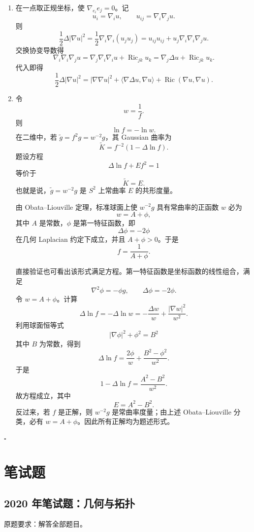\documentclass[UTF8,12pt]{ctexart}
\newenvironment{solution}{%
  \par\medskip
  \noindent{\bfseries 解答}\quad\ignorespaces
}{\hfill$\square$\par\medskip}
\begin{document}
\begin{solution}
\begin{enumerate}[label=(\alph*)]
\item 在一点取正规坐标，使 \(\nabla_{e_i}e_j=0\)。记
\[
u_i=\nabla_i u,\qquad u_{ij}=\nabla_i\nabla_j u.
\]
则
\[
\frac12\Delta|\nabla u|^2
=\frac12\nabla_i\nabla_i(u_j u_j)
=u_{ij}u_{ij}+u_j\nabla_i\nabla_i\nabla_j u.
\]
交换协变导数得
\[
\nabla_i\nabla_i\nabla_j u
=\nabla_j\nabla_i\nabla_i u+\operatorname{Ric}_{jk}u_k
=\nabla_j\Delta u+\operatorname{Ric}_{jk}u_k.
\]
代入即得
\[
\frac12\Delta|\nabla u|^2
=|\nabla\nabla u|^2+\langle\nabla\Delta u,\nabla u\rangle
+\operatorname{Ric}(\nabla u,\nabla u).
\]

\item 令
\[
w=\frac1f.
\]
则
\[
\ln f=-\ln w.
\]
在二维中，若 \(\tilde g=f^2g=w^{-2}g\)，其 Gaussian 曲率为
\[
\tilde K=f^{-2}(1-\Delta\ln f).
\]
题设方程
\[
\Delta\ln f+Ef^2=1
\]
等价于
\[
\tilde K=E.
\]
也就是说，\(\tilde g=w^{-2}g\) 是 \(S^2\) 上常曲率 \(E\) 的共形度量。

由 Obata--Liouville 定理，标准球面上使 \(w^{-2}g\) 具有常曲率的正函数 \(w\) 必为
\[
w=A+\phi,
\]
其中 \(A\) 是常数，\(\phi\) 是第一特征函数，即
\[
\Delta\phi=-2\phi
\]
在几何 Laplacian 约定下成立，并且 \(A+\phi>0\)。于是
\[
f=\frac1{A+\phi}.
\]

直接验证也可看出该形式满足方程。第一特征函数是坐标函数的线性组合，满足
\[
\nabla^2\phi=-\phi g,\qquad \Delta\phi=-2\phi.
\]
令 \(w=A+\phi\)。计算
\[
\Delta\ln f=-\Delta\ln w
=-\frac{\Delta w}{w}+\frac{|\nabla w|^2}{w^2}.
\]
利用球面恒等式
\[
|\nabla\phi|^2+\phi^2=B^2
\]
其中 \(B\) 为常数，得到
\[
\Delta\ln f
=\frac{2\phi}{w}+\frac{B^2-\phi^2}{w^2}.
\]
于是
\[
1-\Delta\ln f
=\frac{A^2-B^2}{w^2}.
\]
故方程成立，其中
\[
E=A^2-B^2.
\]
反过来，若 \(f\) 是正解，则 \(w^{-2}g\) 是常曲率度量；由上述 Obata--Liouville 分类，必有 \(w=A+\phi\)。因此所有正解均为题述形式。
\end{enumerate}
\end{solution}

\section{笔试题}

\subsection{2020 年笔试题：几何与拓扑}

原题要求：解答全部题目。
\end{document}
